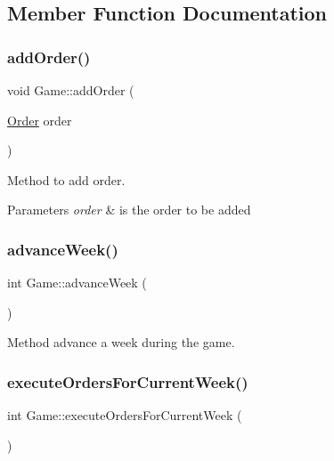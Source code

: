 \subsection{Member Function Documentation}
\mbox{\label{class_game_a0e6b1f8c9d598c7eb860d04c218fa546}} 
\subsubsection{\texorpdfstring{add\+Order()}{addOrder()}}
{\footnotesize\ttfamily void Game\+::add\+Order (\begin{DoxyParamCaption}\item[{\hyperlink{class_order}{Order}}]{order }\end{DoxyParamCaption})}



Method to add order. 


\begin{DoxyParams}{Parameters}
{\em order} & is the order to be added \\
\hline
\end{DoxyParams}
\mbox{\label{class_game_a8471ea91ed18fc2d289eb23747d11d39}} 
\subsubsection{\texorpdfstring{advance\+Week()}{advanceWeek()}}
{\footnotesize\ttfamily int Game\+::advance\+Week (\begin{DoxyParamCaption}{ }\end{DoxyParamCaption})}



Method advance a week during the game. 

\mbox{\label{class_game_aa48501c52deee3c167334844e72a16b9}} 
\subsubsection{\texorpdfstring{execute\+Orders\+For\+Current\+Week()}{executeOrdersForCurrentWeek()}}
{\footnotesize\ttfamily int Game\+::execute\+Orders\+For\+Current\+Week (\begin{DoxyParamCaption}{ }\end{DoxyParamCaption})}



